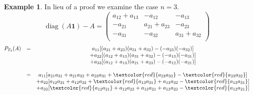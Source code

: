 \documentclass{article}
\newcommand{\diag}{\operatorname{diag}}
\theoremstyle{theorem}
\theoremstyle{definition}
\newtheorem{ex}[thm]{Example}
\begin{document}
\begin{ex}
    In lieu of a proof we examine the case $n=3$.
    \[
        \diag(A\boldsymbol{1})-A
        =
        \begin{pmatrix}
            a_{12}+a_{13}   & -a_{12}       & -a_{13}       \\
            -a_{21}         & a_{21}+a_{23} & -a_{23}       \\
            -a_{31}         & -a_{32}       & a_{31}+a_{32} \\
        \end{pmatrix}
    \]
    \[
        \begin{matrix}
            P_{T_3}(A) & = & a_{11}[(a_{21}+a_{23})(a_{31}+a_{32})-(-a_{23})(-a_{32})] \\
            & & + a_{22}[(a_{12}+a_{13})(a_{31}+a_{32})-(-a_{13})(-a_{31})] \\
            
            & & + a_{33}[(a_{12}+a_{13})(a_{21}+a_{23})-(-a_{12})(-a_{21})] \\ \\
            
            & = & a_{11}[a_{21}a_{31}+a_{21}a_{32}+a_{23}a_{31}+\textcolor{red}{a_{23}a_{32}}-\textcolor{red}{a_{23}a_{32}}] \\
            & & + a_{22}[a_{12}a_{31}+a_{12}a_{32}+\textcolor{red}{a_{13}a_{31}}+a_{13}a_{32}-\textcolor{red}{a_{13}a_{31}}] \\
            & & + a_{33}[\textcolor{red}{a_{12}a_{21}}+a_{12}a_{23}+a_{13}a_{21}+a_{13}a_{23}-\textcolor{red}{a_{12}a_{21}}] \\ \\
            

\end{matrix}\]
\end{ex}
\end{document}
